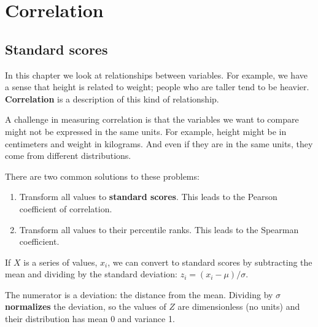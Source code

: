 \documentclass[12pt]{book}
\begin{document}
\chapter{Correlation}

\section{Standard scores}

In this chapter we look at relationships between variables.  For
example, we have a sense that height is related to weight; people who
are taller tend to be heavier.  {\bf Correlation} is a description of
this kind of relationship.


A challenge in measuring correlation is that the variables we want
to compare might not be expressed in the same units.  For example, height
might be in centimeters and weight in kilograms.  And even if they are
in the same units, they come from different distributions.


There are two common solutions to these problems:

\begin{enumerate}

\item Transform all values to {\bf standard scores}.  This leads to
the Pearson coefficient of correlation.



\item Transform all values to their percentile ranks.  This
leads to the Spearman coefficient.


\end{enumerate}

If $X$ is a series of values, $x_i$, we can convert to standard
scores by subtracting the mean and dividing by the standard deviation:
$z_i = (x_i - \mu) / \sigma$.


The numerator is a deviation: the distance from the mean.  Dividing by
$\sigma$ {\bf normalizes} the deviation, so the values of $Z$ are
dimensionless (no units) and their distribution has mean 0 and
variance 1.
\end{document}

